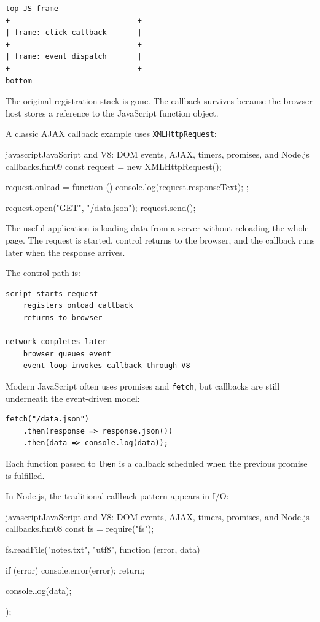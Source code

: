 \begin{verbatim}
top JS frame
+-----------------------------+
| frame: click callback       |
+-----------------------------+
| frame: event dispatch       |
+-----------------------------+
bottom
\end{verbatim}

The original registration stack is gone. The callback survives because the browser host stores a reference to the JavaScript function object.

A classic AJAX callback example uses \texttt{XMLHttpRequest}:

\begin{codebox}[]{javascript}{JavaScript and V8: DOM events, AJAX, timers, promises, and Node.js callbacks.}{fun09}
const request = new XMLHttpRequest();

request.onload = function () {
    console.log(request.responseText);
};

request.open("GET", "/data.json");
request.send();
\end{codebox}


The useful application is loading data from a server without reloading the whole page. The request is started, control returns to the browser, and the callback runs later when the response arrives.

The control path is:

\begin{verbatim}
script starts request
    registers onload callback
    returns to browser

network completes later
    browser queues event
    event loop invokes callback through V8
\end{verbatim}

Modern JavaScript often uses promises and \texttt{fetch}, but callbacks are still underneath the event-driven model:

\begin{verbatim}
fetch("/data.json")
    .then(response => response.json())
    .then(data => console.log(data));
\end{verbatim}

Each function passed to \texttt{then} is a callback scheduled when the previous promise is fulfilled.

In Node.js, the traditional callback pattern appears in I/O:

\begin{codebox}[]{javascript}{JavaScript and V8: DOM events, AJAX, timers, promises, and Node.js callbacks.}{fun08}
const fs = require("fs");

fs.readFile("notes.txt", "utf8", function (error, data) {
    if (error) {
        console.error(error);
        return;
    }

    console.log(data);
});
\end{codebox}


